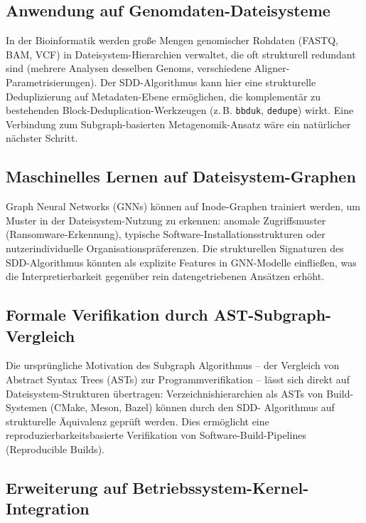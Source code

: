 ﻿\documentclass[a4paper,12pt]{article}
\theoremstyle{definition}
\begin{document}
\subsection{Anwendung auf Genomdaten-Dateisysteme}

In der Bioinformatik werden gro\ss{}e Mengen genomischer Rohdaten
(FASTQ, BAM, VCF) in Dateisystem-Hierarchien verwaltet, die oft
strukturell redundant sind (mehrere Analysen desselben Genoms, verschiedene
Aligner-Parametrisierungen). Der SDD-Algorithmus kann hier eine
strukturelle Deduplizierung auf Metadaten-Ebene erm\"oglichen, die
komplementär zu bestehenden Block-Deduplication-Werkzeugen (z.\,B.
\texttt{bbduk}, \texttt{dedupe}) wirkt. Eine Verbindung zum
Subgraph-basierten Metagenomik-Ansatz \cite{epp2026meta} w\"are ein
nat\"urlicher n\"achster Schritt.

\subsection{Maschinelles Lernen auf Dateisystem-Graphen}

Graph Neural Networks (GNNs) k\"onnen auf Inode-Graphen trainiert werden,
um Muster in der Dateisystem-Nutzung zu erkennen: anomale Zugriffsmuster
(Ransomware-Erkennung), typische Software-Installationsstrukturen oder
nutzerindividuelle Organisationspr\"aferenzen. Die strukturellen Signaturen
des SDD-Algorithmus k\"onnten als explizite Features in GNN-Modelle
einflie\ss{}en, was die Interpretierbarkeit gegen\"uber rein datengetriebenen
Ans\"atzen erh\"oht.

\subsection{Formale Verifikation durch AST-Subgraph-Vergleich}

Die urspr\"ungliche Motivation des Subgraph Algorithmus -- der Vergleich
von Abstract Syntax Trees (ASTs) zur Programmverifikation -- l\"asst sich
direkt auf Dateisystem-Strukturen \"ubertragen: Verzeichnishierarchien als
ASTs von Build-Systemen (CMake, Meson, Bazel) k\"onnen durch den SDD-
Algorithmus auf strukturelle \"Aquivalenz gepr\"uft werden. Dies erm\"oglicht
eine reproduzierbarkeitsbasierte Verifikation von Software-Build-Pipelines
(Reproducible Builds).

\subsection{Erweiterung auf Betriebssystem-Kernel-Integration}
\end{document}
